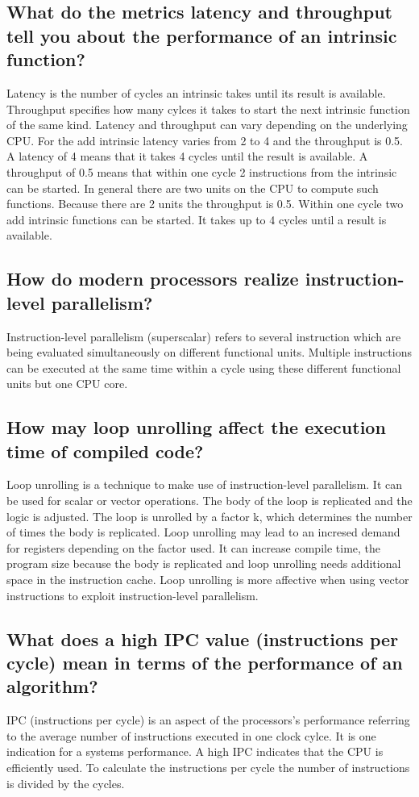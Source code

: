 \documentclass[runningheads]{llncs}
\begin{document}
\subsection{What do the metrics latency and throughput tell you about the performance of an intrinsic function?}
Latency is the number of cycles an intrinsic takes until its result is available. 
Throughput specifies how many cylces it takes to start the next intrinsic function of the same kind.
Latency and throughput can vary depending on the underlying CPU. For the add intrinsic latency varies from 2 to 4
and the throughput is 0.5. A latency of 4 means that it takes 4 cycles until the result is available. A throughput of 0.5
means that within one cycle 2 instructions from the intrinsic can be started. In general there are two units on the CPU to
compute such functions. Because there are 2 units the throughput is 0.5.
Within one cycle two add intrinsic functions can be started. It takes up to 4 cycles until a result is available.

\subsection{How do modern processors realize instruction-level parallelism?}
Instruction-level parallelism (superscalar) refers to several instruction which are being evaluated simultaneously on
different functional units.
Multiple instructions can be executed at the same time within a cycle using these different functional units but one CPU core.

\subsection{How may loop unrolling affect the execution time of compiled code?}
Loop unrolling is a technique to make use of instruction-level parallelism.
It can be used for scalar or vector operations.
The body of the loop is replicated and the logic is adjusted. The loop is unrolled by a factor k, 
which determines the number of times the body is replicated.
Loop unrolling may lead to an incresed demand for registers depending on the factor used. 
It can increase compile time, the program size because the body is replicated and loop unrolling needs additional space in the instruction cache.
Loop unrolling is more affective when using vector instructions to exploit instruction-level parallelism.

\subsection{What does a high IPC value (instructions per cycle) mean in terms of the performance of an algorithm?}
IPC (instructions per cycle) is an aspect of the processors's performance referring to the average number of instructions
executed in one clock cylce. It is one indication for a systems performance. 
A high IPC indicates that the CPU is efficiently used.
To calculate the instructions per cycle the number of instructions is divided by the cycles.
\end{document}
